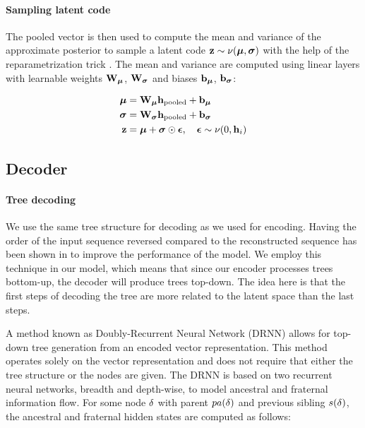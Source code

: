 \paragraph{Sampling latent code} The pooled vector is then used to compute the mean and variance of the approximate posterior to sample a latent code $\mathbf{z} \sim \nu(\boldsymbol\mu, \boldsymbol\sigma)$ with the help of the reparametrization trick \cite{kingmaAutoencodingVariationalBayes2013}. The mean and variance are computed using linear layers with learnable weights $\mathbf{W}_{\boldsymbol\mu}$, $\mathbf{W}_{\boldsymbol\sigma}$ and biases $\mathbf{b}_{\boldsymbol\mu}$, $\mathbf{b}_{\boldsymbol\sigma}$:

\begin{align}
\boldsymbol\mu& = \mathbf{W}_{\boldsymbol\mu} \mathbf{h}_\text{pooled} + \mathbf{b}_{\boldsymbol\mu} \\
\boldsymbol\sigma& = \mathbf{W}_{\boldsymbol\sigma} \mathbf{h}_\text{pooled} + \mathbf{b}_{\boldsymbol\sigma} \\
\mathbf{z} & = \boldsymbol\mu+ \boldsymbol\sigma\odot \boldsymbol{\epsilon}, \quad \boldsymbol{\epsilon} \sim \nu(0, \mathbf{h}_i)
\end{align}
\newpage
\subsection{Decoder}
\label{sec:decoder}

\paragraph{Tree decoding} We use the same tree structure for decoding as we used for encoding. 
Having the order of the input sequence reversed compared to the reconstructed sequence has been shown in \cite{fabiusVariationalRecurrentAutoencoders2015} to improve the performance of the model. 
We employ this technique in our model, which means that since our encoder processes trees bottom-up, the decoder will produce trees top-down. 
The idea here is that the first steps of decoding the tree are more related to the latent space than the last steps.



A method known as Doubly-Recurrent Neural Network (DRNN) \cite{alvarez-melisTreestructuredDecodingDoublyrecurrent2017} allows for top-down tree generation from an encoded vector representation. This method operates solely on the vector representation and does not require that either the tree structure or the nodes are given. The DRNN is based on two recurrent neural networks, breadth and depth-wise, to model ancestral and fraternal information flow. For some node $\delta$ with parent $pa(\delta)$ and previous sibling $s(\delta)$, the ancestral and fraternal hidden states are computed as follows:

